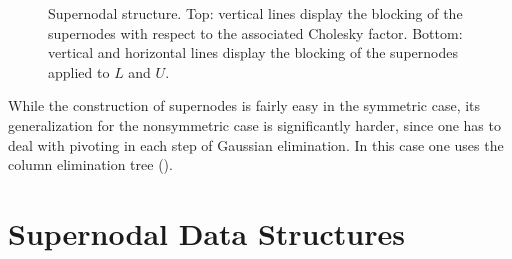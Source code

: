 \begin{figure}
\begin{minipage}{.72\textwidth}
\begin{center}
 \end{center}  
\end{minipage}
    \caption{Supernodal structure. Top: vertical lines display the blocking of the
supernodes with respect to the associated Cholesky factor. Bottom:
vertical and horizontal lines display the blocking of the
supernodes applied to $L$ and $U$.}
    \label{fig:supernodal_structure}
\end{figure}

While the construction of supernodes is fairly easy in the symmetric case,
its generalization for the nonsymmetric case is significantly harder, since one
has to deal with pivoting in each step of Gaussian elimination.
In this case one uses the column elimination tree (\cite{GeoN85}).

\section{Supernodal Data Structures}
\label{sec:parallel}

